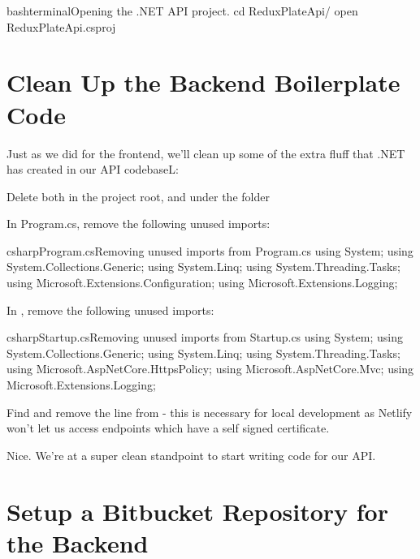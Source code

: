 \documentclass[paper=6in:9in,pagesize=pdftex,headinclude=on,footinclude=on,12pt,twoside]{scrbook}
\begin{document}
\begin{codeInput}{bash}{terminal}{Opening the .NET API project.}
cd ReduxPlateApi/
open ReduxPlateApi.csproj
\end{codeInput}

\section{Clean Up the Backend Boilerplate Code}

Just as we did for the frontend, we'll clean up some of the extra fluff that .NET has created in our API codebaseL:

\begin{arrows}
\item Delete both  in the project root, and  under the  folder
\item In Program.cs, remove the following unused imports:
\begin{codeInput}{csharp}{Program.cs}{Removing unused imports from Program.cs}
using System;
using System.Collections.Generic;
using System.Linq;
using System.Threading.Tasks;
using Microsoft.Extensions.Configuration;
using Microsoft.Extensions.Logging;
\end{codeInput}
\item In , remove the following unused imports:
\begin{codeInput}{csharp}{Startup.cs}{Removing unused imports from Startup.cs}
using System;
using System.Collections.Generic;
using System.Linq;
using System.Threading.Tasks;
using Microsoft.AspNetCore.HttpsPolicy;
using Microsoft.AspNetCore.Mvc;
using Microsoft.Extensions.Logging;
\item Find and remove the line  from  - this is necessary for local development as Netlify won't let us access endpoints which have a self signed certificate.
\end{codeInput}
\end{arrows}

Nice. We're at a super clean standpoint to start writing code for our API.

\section{Setup a Bitbucket Repository for the Backend}

\end{document}
